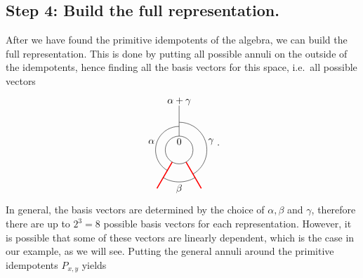 \subsection*{Step 4: Build the full representation.} After we have found the primitive idempotents of the algebra, we can build the full representation. This is done by putting all possible annuli on the outside of the idempotents, hence finding all the basis vectors for this space, i.e.\ all possible vectors
	\begin{equation}
		\begin{tikzpicture}[scale=1,baseline=(current bounding box.center)]
		\draw (0,0) circle (0.5cm);
		\draw[red,line width=0.4mm]
		\foreach \a in {-60, -120} {
			(\a:0.5) -- (\a:1.6)
		};
		\draw ([shift=(-60:1cm)]0,0) arc (-60:90:1cm);
		\draw ([shift=(-120:1.15cm)]0,0) arc (-120:-60:1.15cm);
		\draw ([shift=(240:0.85cm)]0,0) arc (240:90:0.85cm);
		\draw[] (90:0.5) -- (90:1.6);
		\node at (90:.3cm){$0$};\node at (90:1.75cm){$\alpha+\gamma$};
		\node at (-1,0.3) {$\alpha$};
		\node at (1.15,0.3) {$\gamma$};
		\node at (0,-1.4) {$\beta$};
		\end{tikzpicture}.
	\end{equation}
In general, the basis vectors are determined by the choice of $\alpha,\beta$ and $\gamma$, therefore there are up to $2^3=8$ possible basis vectors for each representation. However, it is possible that some of these vectors are linearly dependent, which is the case in our example, as we will see. Putting the general annuli around the primitive idempotents $P_{x,y}$ yields
